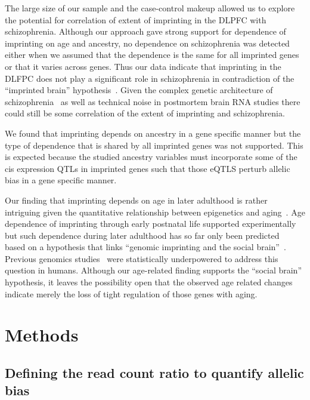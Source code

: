 \documentclass[letterpaper]{article}
\begin{document}
The large size of our sample and the case-control makeup allowed us to explore
the potential for correlation of extent of imprinting in the DLPFC with
schizophrenia.  Although our approach gave strong support for dependence of
imprinting on age and ancestry, no dependence on schizophrenia was detected
either when we assumed that the dependence is the same for all imprinted genes
or that it varies across genes.  Thus our data indicate that imprinting in the
DLFPC does not play a significant role in schizophrenia in contradiction of
the ``imprinted brain'' hypothesis~\cite{Crespi2008}.  Given the complex
genetic architecture of schizophrenia~\cite{Sullivan2012} as well as technical
noise in postmortem brain RNA studies there could still be some correlation of
the extent of imprinting and schizophrenia.

We found that imprinting depends on ancestry in a gene
specific manner but the type of dependence that is shared by all imprinted
genes was not supported.  This is expected because the studied
ancestry variables must incorporate some of the cis expression
QTLs in imprinted genes such that those eQTLS perturb allelic bias in a gene
specific manner.

Our finding that imprinting depends on age in later adulthood is rather
intriguing given the quantitative relationship between epigenetics and
aging~\cite{Horvath2013}.  Age dependence of imprinting through early
postnatal life supported experimentally~\cite{Perez2015} but such dependence
during later adulthood has so far only been predicted~\cite{Ubeda2012} based
on a hypothesis that links ``genomic imprinting and the social
brain''~\cite{Isles2006}.  Previous genomics studies~\cite{Baran2015} were
statistically underpowered to address this question in humans.  Although our
age-related finding supports the ``social brain'' hypothesis, it leaves the
possibility open that the observed age related changes indicate merely the
loss of tight regulation of those genes with aging.


\clearpage

\section{Methods}

\subsection{Defining the read count ratio to quantify allelic bias}
\end{document}
